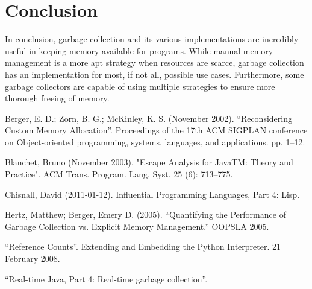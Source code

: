 \documentclass[12pt]{article}
\begin{document}
\section{Conclusion}
In conclusion, garbage collection and its various implementations are incredibly useful in keeping memory available for programs. While manual memory management is a more apt strategy when resources are scarce, garbage collection has an implementation for most, if not all, possible use cases. Furthermore, some garbage collectors are capable of using multiple strategies to ensure more thorough freeing of memory.
\newpage
\begin{thebibliography}{}
  Berger, E. D.; Zorn, B. G.; McKinley, K. S. (November 2002). ``Reconsidering Custom Memory Allocation''. Proceedings of the 17th ACM SIGPLAN conference on Object-oriented programming, systems, languages, and applications. pp. 1–12.

  Blanchet, Bruno (November 2003). "Escape Analysis for JavaTM: Theory and Practice". ACM Trans. Program. Lang. Syst. 25 (6): 713–775.
  
  Chisnall, David (2011-01-12). Influential Programming Languages, Part 4: Lisp.
  
  Hertz, Matthew; Berger, Emery D. (2005). ``Quantifying the Performance of Garbage Collection vs. Explicit Memory Management.'' OOPSLA 2005.

  ``Reference Counts''. Extending and Embedding the Python Interpreter. 21 February 2008.

  ``Real-time Java, Part 4: Real-time garbage collection''.

\end{thebibliography}
\end{document}
